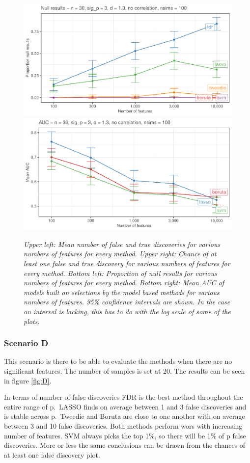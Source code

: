 \documentclass[
]{article}
\begin{document}
\begin{figure}

{\centering \includegraphics[width=0.49\linewidth]{main_files/figure-latex/C2-1} \includegraphics[width=0.49\linewidth]{main_files/figure-latex/C2-2} 

}

\caption{\textit{Upper left: Mean number of false and true discoveries for various numbers of features for every method. Upper right: Chance of at least one false and true discovery for various numbers of features for every method. Bottom left: Proportion of null results for various numbers of features for every method. Bottom right: Mean AUC of models built on selections by the model based methods for various numbers of features. 95\% confidence intervals are shown. In the case an interval is lacking, this has to do with the log scale of some of the plots.}}\label{fig:C2}
\end{figure}

\hypertarget{scenario-d}{%
\subsubsection{Scenario D}\label{scenario-d}}

This scenario is there to be able to evaluate the methods when there are no significant features. The number of samples is set at 20. The results can be seen in figure \ref{fig:D}.

In terms of number of false discoveries FDR is the best method throughout the entire range of p.~LASSO finds on average between 1 and 3 false discoveries and is stable across p.~Tweedie and Boruta are close to one another with on average between 3 and 10 false discoveries. Both methods perform wors with increasing number of features. SVM always picks the top 1\%, so there will be 1\% of p false discoveries. More or less the same conclusions can be drawn from the chances of at least one false discovery plot.
\end{document}
